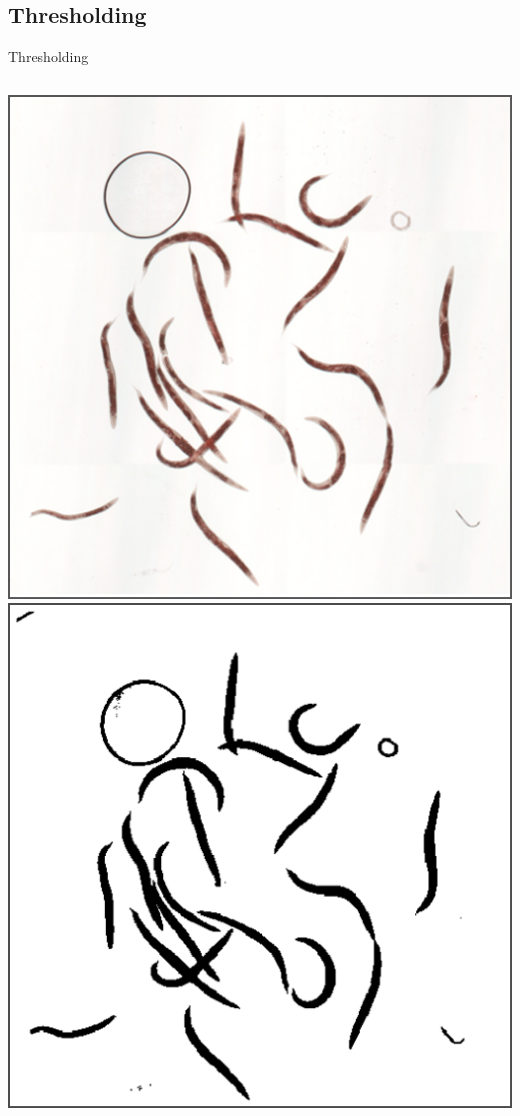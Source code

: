 \documentclass[xcolor=table]{beamer}
\begin{document}
\subsection{Thresholding}
\begin{frame}{Thresholding}

\begin{columns}[c]
\column{1.5in}
\includegraphics[scale=0.27]{original}
\column{1.5in}
\includegraphics[scale=0.27]{thres/worms}

\end{columns}

\end{frame}
\end{document}
